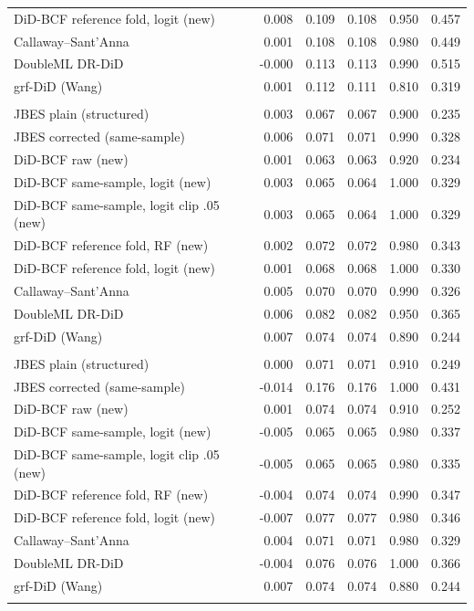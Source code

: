 {\begin{longtable}{lrrrrr}
\quad DiD-BCF reference fold, logit (new) & 0.008 & 0.109 & 0.108 & 0.950 & 0.457 \\
\quad Callaway--Sant'Anna & 0.001 & 0.108 & 0.108 & 0.980 & 0.449 \\
\quad DoubleML DR-DiD & -0.000 & 0.113 & 0.113 & 0.990 & 0.515 \\
\quad grf-DiD (Wang) & 0.001 & 0.112 & 0.111 & 0.810 & 0.319 \\
\addlinespace
\multicolumn{6}{l}{\textit{serial, $N=800$, degree $d=1$}} \\
\quad JBES plain (structured) & 0.003 & 0.067 & 0.067 & 0.900 & 0.235 \\
\quad JBES corrected (same-sample) & 0.006 & 0.071 & 0.071 & 0.990 & 0.328 \\
\quad DiD-BCF raw (new) & 0.001 & 0.063 & 0.063 & 0.920 & 0.234 \\
\quad DiD-BCF same-sample, logit (new) & 0.003 & 0.065 & 0.064 & 1.000 & 0.329 \\
\quad DiD-BCF same-sample, logit clip .05 (new) & 0.003 & 0.065 & 0.064 & 1.000 & 0.329 \\
\quad DiD-BCF reference fold, RF (new) & 0.002 & 0.072 & 0.072 & 0.980 & 0.343 \\
\quad DiD-BCF reference fold, logit (new) & 0.001 & 0.068 & 0.068 & 1.000 & 0.330 \\
\quad Callaway--Sant'Anna & 0.005 & 0.070 & 0.070 & 0.990 & 0.326 \\
\quad DoubleML DR-DiD & 0.006 & 0.082 & 0.082 & 0.950 & 0.365 \\
\quad grf-DiD (Wang) & 0.007 & 0.074 & 0.074 & 0.890 & 0.244 \\
\addlinespace
\multicolumn{6}{l}{\textit{serial, $N=800$, degree $d=2$}} \\
\quad JBES plain (structured) & 0.000 & 0.071 & 0.071 & 0.910 & 0.249 \\
\quad JBES corrected (same-sample) & -0.014 & 0.176 & 0.176 & 1.000 & 0.431 \\
\quad DiD-BCF raw (new) & 0.001 & 0.074 & 0.074 & 0.910 & 0.252 \\
\quad DiD-BCF same-sample, logit (new) & -0.005 & 0.065 & 0.065 & 0.980 & 0.337 \\
\quad DiD-BCF same-sample, logit clip .05 (new) & -0.005 & 0.065 & 0.065 & 0.980 & 0.335 \\
\quad DiD-BCF reference fold, RF (new) & -0.004 & 0.074 & 0.074 & 0.990 & 0.347 \\
\quad DiD-BCF reference fold, logit (new) & -0.007 & 0.077 & 0.077 & 0.980 & 0.346 \\
\quad Callaway--Sant'Anna & 0.004 & 0.071 & 0.071 & 0.980 & 0.329 \\
\quad DoubleML DR-DiD & -0.004 & 0.076 & 0.076 & 1.000 & 0.366 \\
\quad grf-DiD (Wang) & 0.007 & 0.074 & 0.074 & 0.880 & 0.244 \\
\addlinespace
\end{longtable}
}
